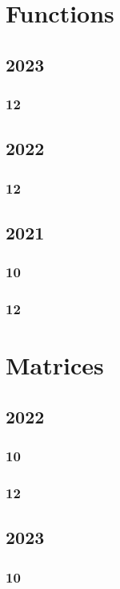 \documentclass[11pt]{book}
\begin{document}
\chapter{Functions}
\section{2023}
\subsection{12}

\section{2022}
\subsection{12}

\section{2021}
\subsection{10}

\subsection{12}

\chapter{Matrices}
\section{2022}
\subsection{10}

\subsection{12}

\section{2023}
\subsection{10}

\end{document}
